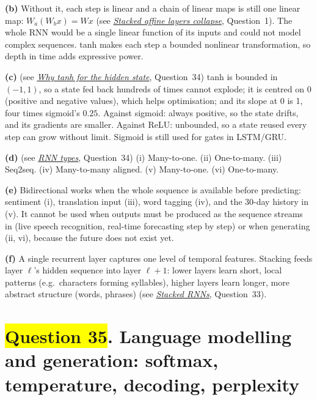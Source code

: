 \documentclass[12pt,a4paper]{article}
\newcommand{\seeconcept}[3]{(see \hyperref[#1]{\textit{#2}}, Question~#3)}
\newcommand{\hlq}[1]{{\setlength{\fboxsep}{1.5pt}\colorbox{yellow}{#1}}}
\begin{document}
\textbf{(b)} Without it, each step is linear and a chain of linear maps is still one linear map: $W_a(W_bx)=Wx$ \seeconcept{c:collapse}{Stacked affine layers collapse}{1}. The whole RNN would be a single linear function of its inputs and could not model complex sequences. tanh makes each step a bounded nonlinear transformation, so depth in time adds expressive power.

\textbf{(c)} \seeconcept{c:whytanh}{Why tanh for the hidden state}{34} tanh is bounded in $(-1,1)$, so a state fed back hundreds of times cannot explode; it is centred on 0 (positive and negative values), which helps optimisation; and its slope at 0 is 1, four times sigmoid's $0.25$. Against sigmoid: always positive, so the state drifts, and its gradients are smaller. Against ReLU: unbounded, so a state reused every step can grow without limit. Sigmoid is still used for gates in LSTM/GRU.

\textbf{(d)} \seeconcept{c:rnntypes}{RNN types}{34}
(i) Many-to-one. (ii) One-to-many. (iii) Seq2seq. (iv) Many-to-many aligned. (v) Many-to-one. (vi) One-to-many.

\textbf{(e)} Bidirectional works when the whole sequence is available before predicting: sentiment (i), translation input (iii), word tagging (iv), and the 30-day history in (v). It cannot be used when outputs must be produced as the sequence streams in (live speech recognition, real-time forecasting step by step) or when generating (ii, vi), because the future does not exist yet.

\textbf{(f)} A single recurrent layer captures one level of temporal features. Stacking feeds layer $\ell$'s hidden sequence into layer $\ell+1$: lower layers learn short, local patterns (e.g.\ characters forming syllables), higher layers learn longer, more abstract structure (words, phrases) \seeconcept{c:stacked}{Stacked RNNs}{33}.

\section[Question 35. Language modelling and generation: softmax, temperature, decoding, perplexity]{\hlq{Question 35}. Language modelling and generation: softmax, temperature, decoding, perplexity}
\end{document}
